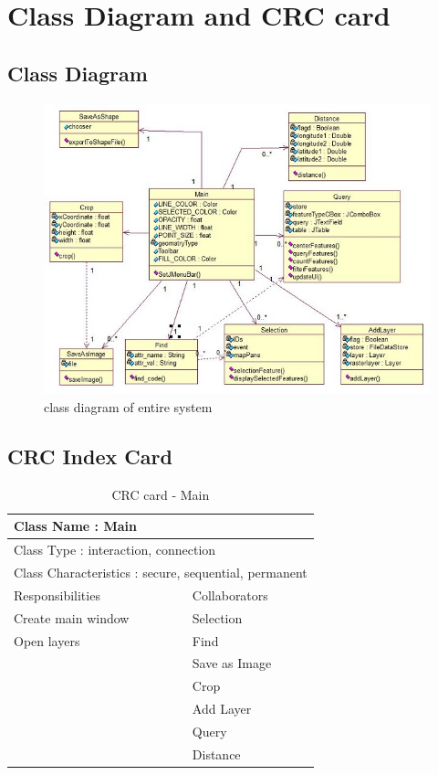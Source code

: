 \chapter{Class Diagram and CRC card}

\section{Class Diagram}

\begin{figure}[h]
\begin{center}
  \includegraphics[scale=0.8] {Class.jpg}
  \caption [Class Diagram]{class diagram of entire system}
\end{center}
\end{figure}

\section{CRC Index Card}

\begin{table}[h]
\begin{tabular}{|p{7cm}|p{7cm}|}
  \hline
  \multicolumn{2}{|l|}{ Class Name : Main} \\
  \hline
  \multicolumn{2}{|l|}{ Class Type : interaction, connection} \\
  \hline
  \multicolumn{2}{|l|}{ Class Characteristics : secure, sequential, permanent} \\
  \hline
  Responsibilities & Collaborators  \\
  \hline
  Create main window & Selection \\
  Open layers & Find \\
   & Save as Image\\
   & Crop \\
   & Add Layer \\
   & Query \\
   & Distance \\
  \hline
\end{tabular}
\caption[CRC card - Main Class]{CRC card - Main}
\end{table}

